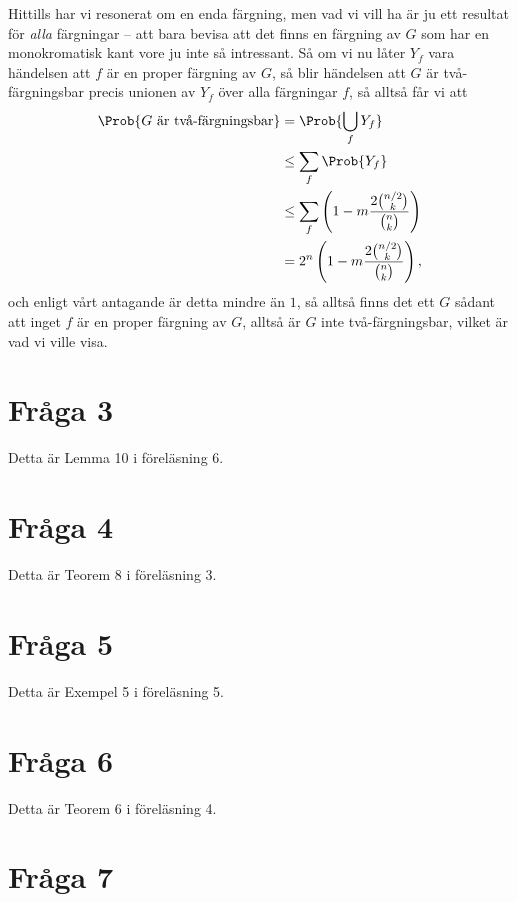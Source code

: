 \documentclass[nobib]{tufte-handout}
\begin{document}
Hittills har vi resonerat om en enda färgning, men vad vi vill ha är ju ett resultat för \emph{alla} färgningar -- att bara bevisa att det finns en färgning av $G$ som har en monokromatisk kant vore ju inte så intressant. Så om vi nu låter $Y_f$ vara händelsen att $f$ är en proper färgning av $G$, så blir händelsen att $G$ är två-färgningsbar precis unionen av $Y_f$ över alla färgningar $f$, så alltså får vi att
\begin{align*}
  \Prob{G \text{ är två-färgningsbar}}
  &= \Prob{\bigcup_{f} Y_f} \\
  &\leq \sum_f \Prob{Y_f} \\
  &\leq \sum_f \left(1 - m\frac{2\binom{n/2}{k}}{\binom{n}{k}}\right) \\
  &= 2^n\left(1 - m\frac{2\binom{n/2}{k}}{\binom{n}{k}}\right),
\end{align*}
och enligt vårt antagande är detta mindre än $1$, så alltså finns det ett $G$ sådant att inget $f$ är en proper färgning av $G$, alltså är $G$ inte två-färgningsbar, vilket är vad vi ville visa.

\section{Fråga 3}

Detta är Lemma 10 i föreläsning 6.

\section{Fråga 4}

Detta är Teorem 8 i föreläsning 3.

\section{Fråga 5}

Detta är Exempel 5 i föreläsning 5.

\section{Fråga 6}

Detta är Teorem 6 i föreläsning 4.

\section{Fråga 7}
\end{document}
